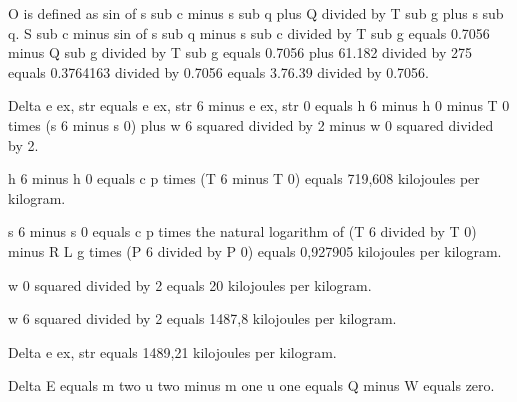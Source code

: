 O is defined as sin of s sub c minus s sub q plus Q divided by T sub g plus s sub q. S sub c minus sin of s sub q minus s sub c divided by T sub g equals 0.7056 minus Q sub g divided by T sub g equals 0.7056 plus 61.182 divided by 275 equals 0.3764163 divided by 0.7056 equals 3.76.39 divided by 0.7056.

Delta e ex, str equals e ex, str 6 minus e ex, str 0 equals h 6 minus h 0 minus T 0 times (s 6 minus s 0) plus w 6 squared divided by 2 minus w 0 squared divided by 2.

h 6 minus h 0 equals c p times (T 6 minus T 0) equals 719,608 kilojoules per kilogram.

s 6 minus s 0 equals c p times the natural logarithm of (T 6 divided by T 0) minus R L g times (P 6 divided by P 0) equals 0,927905 kilojoules per kilogram.

w 0 squared divided by 2 equals 20 kilojoules per kilogram.

w 6 squared divided by 2 equals 1487,8 kilojoules per kilogram.

Delta e ex, str equals 1489,21 kilojoules per kilogram.

Delta E equals m two u two minus m one u one equals Q minus W equals zero.